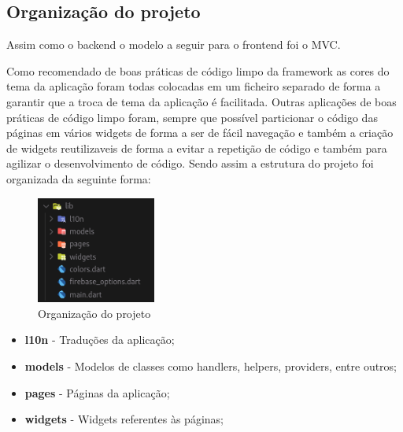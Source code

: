 \subsection{Organização do projeto}
Assim como o backend o modelo a seguir para o frontend foi o MVC. 

Como recomendado de boas práticas de código limpo da framework as cores do tema da aplicação foram todas colocadas em um ficheiro separado de forma a garantir que a troca de tema da aplicação é facilitada. Outras aplicações de boas práticas de código limpo foram, sempre que possível particionar o código das páginas em vários widgets de forma a ser de fácil navegação e também a criação de widgets reutilizaveis de forma a evitar a repetição de código e também para agilizar o desenvolvimento de código. Sendo assim a estrutura do projeto foi organizada da seguinte forma:
\begin{figure}[htb]
  \centering
  \includegraphics[width=0.35\textwidth]{images/implementacao/frontend/organizacao_projeto.png}
  \caption{Organização do projeto}
  \label{fig:68}
\end{figure}

\begin{itemize}
  \item \textbf{l10n} - Traduções da aplicação;
  \item \textbf{models} - Modelos de classes como handlers, helpers, providers, entre outros;
  \item \textbf{pages} - Páginas da aplicação;
  \item \textbf{widgets} - Widgets referentes às páginas;
\end{itemize}
\vspace{60mm}

